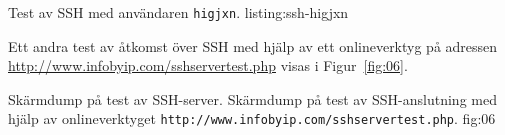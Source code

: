             {Test av SSH med användaren \texttt{higjxn}.}
            {listing:ssh-higjxn}

Ett andra test av åtkomst över SSH med hjälp av ett onlineverktyg på adressen
\url{http://www.infobyip.com/sshservertest.php} \cite{ipv6:sshservertest}
visas i Figur~\ref{fig:06}.

           {Skärmdump på test av SSH-server.}
					 {Skärmdump på test av SSH-anslutning med hjälp av onlineverktyget 
				    \texttt{http://www.infobyip.com/sshservertest.php}.}
           {fig:06}

